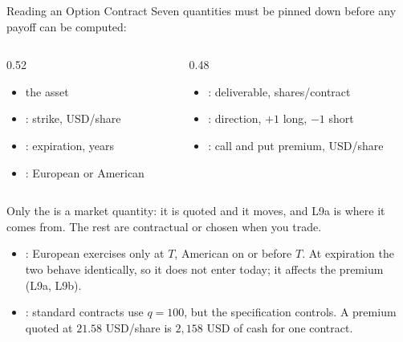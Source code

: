 \documentclass[aspectratio=169,11pt]{beamer}
\newcommand{\N}{\mathbb{N}}
\begin{document}
\begin{frame}{Reading an Option Contract}
  \vspace{-0.2em}
  Seven quantities must be pinned down before any payoff can be computed:
  \begin{columns}[T]
    \begin{column}{0.52\textwidth}
      \small
      \begin{itemize}\setlength{\itemsep}{0.12em}
        \item the  asset
        \item {}: strike, USD/share
        \item {}: expiration, years
        \item {}: European or American
      \end{itemize}
    \end{column}
    \begin{column}{0.48\textwidth}
      \small
      \begin{itemize}\setlength{\itemsep}{0.12em}
        \item \hilite{$q\in\N$}: deliverable, shares/contract
        \item {}: direction, $+1$ long, $-1$ short
        \item {}: call and put premium, USD/share
      \end{itemize}
    \end{column}
  \end{columns}
  \vspace{0.4em}
  Only the  is a market quantity: it is quoted and it moves, and
  L9a is where it comes from. The rest are contractual or chosen when you trade.
  \begin{itemize}\setlength{\itemsep}{0.2em}
    \item {}: European exercises only at $T$, American on or
      before $T$. At expiration the two behave identically, so it does not enter
      today; it affects the premium (L9a, L9b).
    \item {}: standard contracts use $q=100$, but the
      specification controls. A premium quoted at $21.58$ USD/share is
      $2{,}158$ USD of cash for one contract.
  \end{itemize}
\end{frame}
\end{document}
